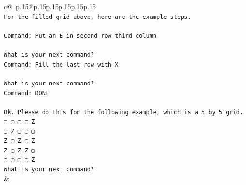 \documentclass{article}
\begin{document}
{\begin{supertabular}{c@{$\;$}|p{.15\linewidth}@{}p{.15\linewidth}p{.15\linewidth}p{.15\linewidth}p{.15\linewidth}p{.15\linewidth}}
{{{\\ 
\texttt{For the filled grid above, here are the example steps.} \\
\\ 
\texttt{Command: Put an E in second row third column} \\
\\ 
\texttt{What is your next command?} \\
\texttt{Command: Fill the last row with X} \\
\\ 
\texttt{What is your next command?} \\
\texttt{Command: DONE} \\
\\ 
\texttt{Ok. Please do this for the following example, which is a 5 by 5 grid.} \\
\texttt{▢ ▢ ▢ ▢ Z} \\
\texttt{▢ Z ▢ ▢ ▢} \\
\texttt{Z ▢ Z ▢ Z} \\
\texttt{Z ▢ Z Z ▢} \\
\texttt{▢ ▢ ▢ ▢ Z} \\
\texttt{What is your next command?} \\
            }
        }
    }
    & \\ \\


\end{supertabular}}
\end{document}
